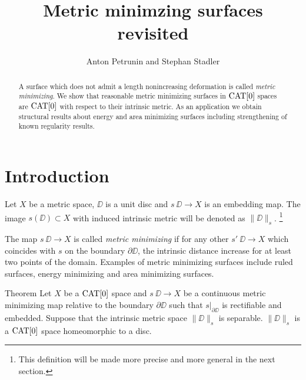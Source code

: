 \documentclass{article}
\begin{document}
\title{Metric minimzing surfaces revisited}
\author{Anton Petrunin and Stephan Stadler}


\date{}

\maketitle

\begin{abstract}
A surface which does not admit a length nonincreasing deformation is called \emph{metric minimizing}.
We show that reasonable metric minimizing surfaces in $\mathop{\rm CAT}\nolimits[0]$ spaces are $\mathop{\rm CAT}\nolimits[0]$ with respect to their intrinsic metric.
As an application we obtain structural results about energy and area minimizing surfaces including
strengthening of known regularity results. 

\end{abstract}

\section{Introduction}

Let $X$ be a metric space, $\DD$ is a unit disc and $s\:\DD\to X$ is an embedding map.
The image $s(\DD)\subset X$ with induced intrinsic metric will be denoted as $\|\DD\|_s$.%
\footnote{This definition will be made more precise and more general in the next section.}

The map $s\:\DD\to X$ is called \emph{metric minimizing} if for any other $s'\:\DD\to X$ which coincides with $s$ on the boundary $\partial \DD$, 
the intrinsic distance increase for at least two points of the domain.
Examples of metric minimizing surfaces include
ruled surfaces, energy minimizing and area minimizing surfaces.


\begin{thm}{Theorem}\label{thm:mainintro}
Let $X$ be a $\mathop{\rm CAT}\nolimits[0]$ space 
and $s\:\DD\to X$ be a continuous metric minimizing map relative to the boundary $\partial\DD$ such that $s|_{\partial\DD}$ is rectifiable
and embedded.
Suppose that the intrinsic metric space $\|\DD\|_s$  is separable. 
$\|\DD\|_s$ is a $\mathop{\rm CAT}\nolimits[0]$ space homeomorphic to a disc.
\end{thm}
\end{document}
